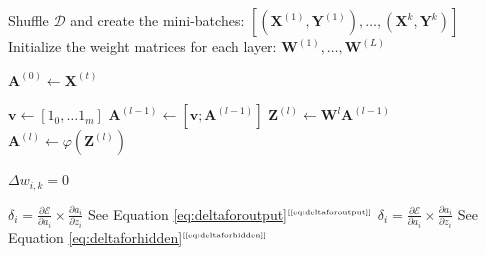 \documentclass[xcolor={table}]{beamer}
\newcommand{\ourEqRef}[1]{\eqref{#1}$^{\text{\tiny[\pageref{#1}]}}$}
\begin{document}
\begin{frame}[plain]
\tiny
\begin{algorithmic}[1]

\State Shuffle $\mathcal{D}$ and create the mini-batches: $[(\mathbf{X}^{(1)},\mathbf{Y}^{(1)}), \dots, (\mathbf{X}^{k},\mathbf{Y}^{k})]$ \label{algLine:minibatchinit}
\State Initialize the weight matrices for each layer: $\mathbf{W}^{(1)}, \dots, \mathbf{W}^{(L)}$ \label{algLine:weightinit}

\Repeat \label{algLine:epochloop}
 \label{algLine:forloop}
	\State $\mathbf{A}^{(0)}\leftarrow \mathbf{X}^{(t)}$ \label{algLine:inputs}
	
	 \label{algLine:forwardstart}
		\State $\mathbf{v} \leftarrow [1_0, \dots 1_m]$ \label{algLine:biasvector}
		\State $\mathbf{A}^{(l-1)} \leftarrow [\mathbf{v};\mathbf{A}^{(l-1)}]$ \label{algLine:biasinsertion}
		\State $\mathbf{Z}^{(l)} \leftarrow \mathbf{W}^{l} \mathbf{A}^{(l-1)}$ \label{algLine:weightsbyactivations}
		\State $\mathbf{A}^{(l)} \leftarrow \varphi(\mathbf{Z}^{(l)})$ \label{algLine:activationFunctions}
	\EndFor \label{algLine:forwardend}

	 \label{algLine:startSumInit}
		\State $\Delta w_{i,k} = 0$
	\EndFor \label{algLine:endSumInit}
	
	 \label{algLine:backpropbatch}
			\label{algLine:deltasoutput}
			\State $\delta_i = \frac{\partial \mathcal{E}}{\partial{a_i}} \times \frac{\partial a_i}{\partial z_i}$ \label{algLine:deltaCalc1}
			\Comment See Equation \ourEqRef{eq:deltaforoutput} 
		\EndFor \label{algLine:deltasoutputend}
		 \label{algLine:deltahidden}
				\State $\delta_i = \frac{\partial \mathcal{E}}{\partial{a_i}} \times \frac{\partial a_i}{\partial z_i}$ \label{algLine:deltaCalc2}
				\Comment See Equation \ourEqRef{eq:deltaforhidden}
			\EndFor 
		\EndFor \label{algLine:deltahiddenend}
		

\end{algorithmic}
\end{frame}
\end{document}
